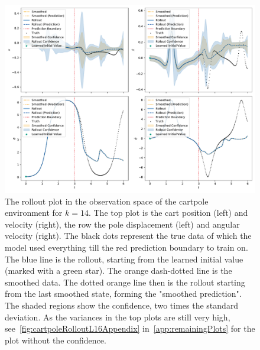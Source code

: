 		\begin{figure}
			\centering
			\includegraphics[width=\linewidth]{figures/results/cartpole-gym/run-latent-dim-16/rollout-observations-N0.pdf}
			\caption[Rollout of the cartpole experiment for 14 latent dimensions with confidence]{The rollout plot in the observation space of the cartpole environment for \(k = 14\). The top plot is the cart position (left) and velocity (right), the row the pole displacement (left) and angular velocity (right). The black dots represent the true data of which the model used everything till the red prediction boundary to train on. The blue line is the rollout, starting from the learned initial value (marked with a green star). The orange dash-dotted line is the smoothed data. The dotted orange line then is the rollout starting from the last smoothed state, forming the "smoothed prediction". The shaded regions show the confidence, \ie two times the standard deviation. As the variances in the top plots are still very high, see~\autoref{fig:cartpoleRolloutL16Appendix} in~\autoref{app:remainingPlots} for the plot without the confidence.}
			\label{fig:cartpoleRolloutL16}
		\end{figure}
